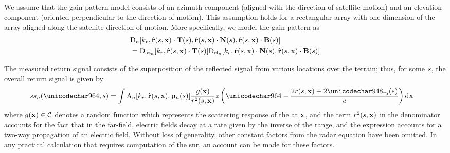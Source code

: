 \par
We assume that the gain-pattern model consists of an azimuth component (aligned with the direction of satellite motion) and an elevation component (oriented perpendicular to the direction of motion). This assumption holds for a rectangular array with one dimension of the array aligned along the satellite direction of motion. More specifically, we model the gain-pattern as
\begin{equation}
\begin{split}
 &\dPattern{\channelIndex}[\kr, \uRangeVectorParm\cdot\vct{T}(\parm), \uRangeVectorParm\cdot\vct{N}(\parm), \uRangeVectorParm\cdot\vct{B}(\parm)]\\ &= \dazPattern{\channelIndex}[\kr, \uRangeVectorParm\cdot\vct{T}(\parm)]\delPattern{\channelIndex}[\kr, \uRangeVectorParm\cdot\vct{N}(\parm), \uRangeVectorParm\cdot\vct{B}(\parm)] 
\end{split} 
\label{eq:antennaDiversityCurveFactored}
\end{equation}
\par
The measured return signal consists of the superposition of the reflected signal from various locations over the terrain; thus, for some $s$, the overall return signal is given by
\begin{equation}
\begin{split}
 \stst{\channelIndex}(\fasttime,\parm)&=\int\pattern{\channelIndex}[\kr, \uRangeVectorParm, \pAntennaParm{\channelIndex}]\frac{\reflectivity(\vct\target)}{\amplitude\range^2(\parm, \targetnoparm)} \pulse\left(\fasttime-\frac{2\amplitude\range(\parm, \targetnoparm)+2\rangeErrorZero(\parm)}{c}\right)\d\vct\target
 \end{split}
\end{equation}
where $g(\mathbf{\mathbf{x}})\in\mathcal{C}$ denotes a random function which represents the scattering response of the  at $\mathbf{\mathbf{x}}$, and the term $\mathnormal{r}^2(s,\mathbf{\mathbf{x}})$ in the denominator accounts for the fact that in the far-field, electric fields decay at a rate given by the inverse of the range, and the expression accounts for a two-way propagation of an electric field. Without loss of generality, other constant factors from the radar equation have been omitted. In any practical calculation that requires computation of the \gls{snr}, an account can be made for these factors.
